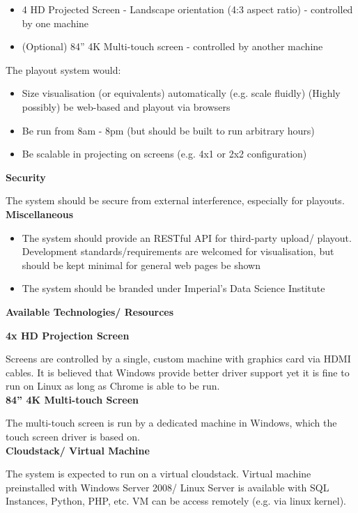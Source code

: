 \documentclass[a4paper, titlepage]{article}
\begin{document}
\begin{itemize}
\item 4 HD Projected Screen - Landscape orientation (4:3 aspect ratio) - controlled by one machine 
\item (Optional) 84” 4K Multi-touch screen - controlled by another machine
\end{itemize}

The playout system would:

\begin{itemize}
\item Size visualisation (or equivalents) automatically (e.g. scale fluidly) (Highly possibly) be web-based and playout via browsers
\item Be run from 8am - 8pm (but should be built to run arbitrary hours)
\item Be scalable in projecting on screens (e.g. 4x1 or 2x2 configuration)\\
\end{itemize}

\textbf{\large Security}

The system should be secure from external interference, especially for playouts.\\

\textbf{\large Miscellaneous}

\begin{itemize}
\item The system should provide an RESTful API for third-party upload/ playout.
Development standards/requirements are welcomed for visualisation, but should be kept minimal for general web pages be shown
\item The system should be branded under Imperial’s Data Science Institute\\
\end{itemize}


\textbf{\Large Available Technologies/ Resources} \vspace{5pt}

\textbf{\large 4x HD Projection Screen}

Screens are controlled by a single, custom machine with graphics card via HDMI cables. It is believed that Windows provide better driver support yet it is fine to run on Linux as long as Chrome is able to be run.\\

\textbf{\large 84” 4K Multi-touch Screen}

The multi-touch screen is run by a dedicated machine in Windows, which the touch screen driver is based on.\\

\textbf{\large Cloudstack/ Virtual Machine}

The system is expected to run on a virtual cloudstack. Virtual machine preinstalled with Windows Server 2008/ Linux Server is available with SQL Instances, Python, PHP, etc. VM can be access remotely (e.g. via linux kernel).\\
\end{document}
